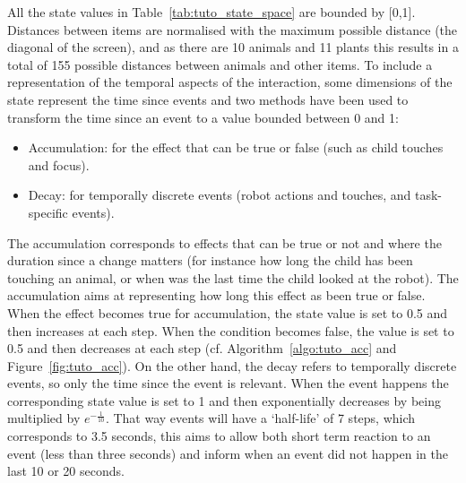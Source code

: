 All the state values in Table~\ref{tab:tuto_state_space} are bounded by [0,1]. Distances between items are normalised with the maximum possible distance (the diagonal of the screen), and as there are 10 animals and 11 plants this results in a total of 155 possible distances between animals and other items. To include a representation of the temporal aspects of the interaction, some dimensions of the state represent the time since events and two methods have been used to transform the time since an event to a value bounded between 0 and 1:
\begin{itemize}
	\item Accumulation: for the effect that can be true or false (such as child touches and focus).
	\item Decay: for temporally discrete events (robot actions and touches, and task-specific events).
\end{itemize}

The accumulation corresponds to effects that can be true or not and where the duration since a change matters (for instance how long the child has been touching an animal, or when was the last time the child looked at the robot). The accumulation aims at representing how long this effect as been true or false. When the effect becomes true for accumulation, the state value is set to 0.5 and then increases at each step. When the condition becomes false, the value is set to 0.5 and then decreases at each step (cf. Algorithm~\ref{algo:tuto_acc} and Figure~\ref{fig:tuto_acc}). On the other hand, the decay refers to temporally discrete events, so only the time since the event is relevant. When the event happens the corresponding state value is set to 1 and then exponentially decreases by being multiplied by $e^{-\frac{1}{10}}$. That way events will have a `half-life' of 7 steps, which corresponds to 3.5 seconds, this aims to allow both short term reaction to an event (less than three seconds) and inform when an event did not happen in the last 10 or 20 seconds.


